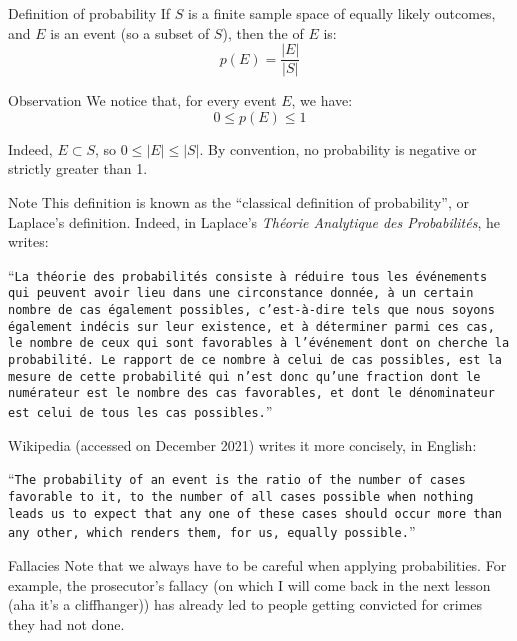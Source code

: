 \documentclass[a4paper]{article}
\begin{document}
\begin{parag}{Definition of probability}
    If $S$ is a finite sample space of equally likely outcomes, and $E$ is an event (so a subset of $S$), then the  of $E$ is:
    \[p\left(E\right) = \frac{\left|E\right|}{\left|S\right|}\]

    \begin{subparag}{Observation}
        We notice that, for every event $E$, we have: 
        \[0 \leq p\left(E\right) \leq 1\]

        Indeed, $E \subset S$, so $0 \leq \left|E\right| \leq \left|S\right|$. By convention, no probability is negative or strictly greater than 1.
    \end{subparag}

    \begin{subparag}{Note}
        This definition is known as the ``classical definition of probability'', or Laplace's definition. Indeed, in Laplace's \textit{Théorie Analytique des Probabilités}, he writes:
        
        \vspace{1em}
        
        ``\texttt{La théorie des probabilités consiste à réduire tous les événements qui peuvent avoir lieu dans une circonstance donnée, à un certain nombre de cas également possibles, c'est-à-dire tels que nous soyons également indécis sur leur existence, et à déterminer parmi ces cas, le nombre de ceux qui sont favorables à l'événement dont on cherche la probabilité. Le rapport de ce nombre à celui de cas possibles, est la mesure de cette probabilité qui n'est donc qu'une fraction dont le numérateur est le nombre des cas favorables, et dont le dénominateur est celui de tous les cas possibles.}''

        \vspace{1em}

        Wikipedia (accessed on  December 2021) writes it more concisely, in English:

        \vspace{1em}

        ``\texttt{The probability of an event is the ratio of the number of cases favorable to it, to the number of all cases possible when nothing leads us to expect that any one of these cases should occur more than any other, which renders them, for us, equally possible.}''
    \end{subparag}
    
    \begin{subparag}{Fallacies}
        Note that we always have to be careful when applying probabilities. For example, the prosecutor's fallacy (on which I will come back in the next lesson (aha it's a cliffhanger)) has already led to people getting convicted for crimes they had not done.
    \end{subparag}
\end{parag}
\end{document}
